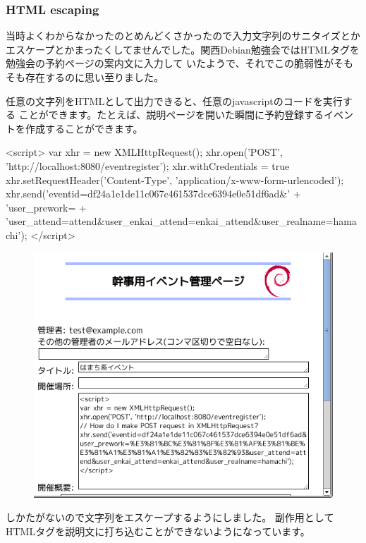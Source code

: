 \documentclass[mingoth,a4paper]{jsarticle}
\begin{document}
\subsubsection{HTML escaping}

当時よくわからなかったのとめんどくさかったので入力文字列のサニタイズとかエスケープとかまったくしてませんでした。関西Debian勉強会ではHTMLタグを勉強会の予約ページの案内文に入力して
いたようで、それでこの脆弱性がそもそも存在するのに思い至りました。

任意の文字列をHTMLとして出力できると、任意のjavascriptのコードを実行する
ことができます。たとえば、説明ページを開いた瞬間に予約登録するイベントを作成することができます。

\begin{commandline}
<script>
var xhr = new XMLHttpRequest();
xhr.open('POST', 'http://localhost:8080/eventregister');
xhr.withCredentials = true
xhr.setRequestHeader('Content-Type', 'application/x-www-form-urlencoded'); 
xhr.send('eventid=df24a1e1de11c067c461537dce6394e0e51df6ad&' 
+ 'user_prework=%
+ 'user_attend=attend&user_enkai_attend=enkai_attend&user_realname=hamachi');
</script>
\end{commandline}

\begin{figure}\includegraphics[width=\hsize]{image201201/xhr.png}\end{figure}

しかたがないので文字列をエスケープするようにしました。
副作用としてHTMLタグを説明文に打ち込むことができないようになっています。
\end{document}
